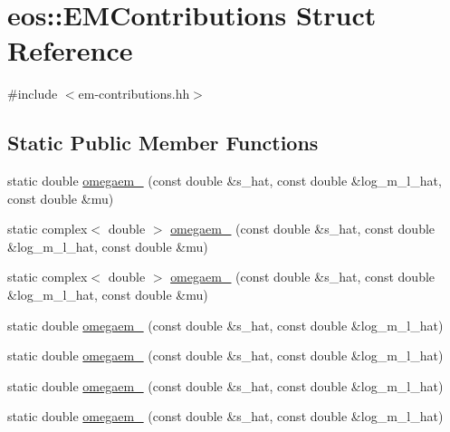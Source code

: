 \hypertarget{structeos_1_1EMContributions}{
\section{eos::EMContributions Struct Reference}
\label{structeos_1_1EMContributions}
}


{\ttfamily \#include $<$em-\/contributions.hh$>$}\subsection*{Static Public Member Functions}
\begin{DoxyCompactItemize}
\item 
static double \hyperlink{structeos_1_1EMContributions_afdea35ec16c8b9f64ee58628d4de03d4}{omegaem\_} (const double \&s\_\-hat, const double \&log\_\-m\_\-l\_\-hat, const double \&mu)
\item 
static complex$<$ double $>$ \hyperlink{structeos_1_1EMContributions_a724b13f0a3c5aa60717d95cdef25d88b}{omegaem\_} (const double \&s\_\-hat, const double \&log\_\-m\_\-l\_\-hat, const double \&mu)
\item 
static complex$<$ double $>$ \hyperlink{structeos_1_1EMContributions_a8b4ae92fda701eafc27649d2d40862ca}{omegaem\_} (const double \&s\_\-hat, const double \&log\_\-m\_\-l\_\-hat, const double \&mu)
\item 
static double \hyperlink{structeos_1_1EMContributions_a61b875199e526faafedacc996a00168d}{omegaem\_} (const double \&s\_\-hat, const double \&log\_\-m\_\-l\_\-hat)
\item 
static double \hyperlink{structeos_1_1EMContributions_afaa4c022d6686394328ff7b385267b68}{omegaem\_} (const double \&s\_\-hat, const double \&log\_\-m\_\-l\_\-hat)
\item 
static double \hyperlink{structeos_1_1EMContributions_a31141870ccd13bbd979383f7089f024d}{omegaem\_} (const double \&s\_\-hat, const double \&log\_\-m\_\-l\_\-hat)
\item 
static double \hyperlink{structeos_1_1EMContributions_a0e1e2725d47f8e24a8a065b96a39e114}{omegaem\_} (const double \&s\_\-hat, const double \&log\_\-m\_\-l\_\-hat)
\end{DoxyCompactItemize}


